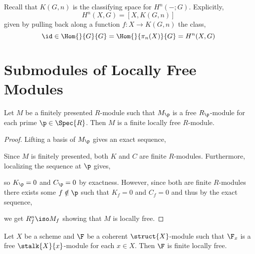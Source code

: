 \documentclass[12pt]{article}
\begin{document}
Recall that $K(G, n)$ is the classifying space for $H^n(- ; G)$. Explicitly,
\[ H^n(X, G) = [X, K(G, n)] \]
given by pulling back along a function $f : X \to K(G,n)$ the class,
\[ \id \in \Hom{}{G}{G} = \Hom{}{\pi_n(X)}{G} = H^n(X, G) \]

\section{Submodules of Locally Free Modules}

\begin{lemma}
Let $M$ be a finitely presented $R$-module such that $M_\p$ is a free $R_\p$-module for each prime $\p \in \Spec{R}$. Then $M$ is a finite locally free $R$-module.
\end{lemma}

\begin{proof}
Lifting a basis of $M_\p$ gives an exact sequence,
\begin{center}
\end{center}
Since $M$ is finitely presented, both $K$ and $C$ are finite $R$-modules. Furthermore, localizing the sequence at $\p$ gives,
\begin{center}
\end{center}
so $K_\p = 0$ and $C_\p = 0$ by exactness. However, since both are finite $R$-modules there exists some $f \notin \p$ such that $K_f = 0$ and $C_f = 0$ and thus by the exact sequence,
\begin{center}
\end{center}
we get $R^n_f \iso M_f$ showing that $M$ is locally free.
\end{proof}

\begin{lemma}
Let $X$ be a scheme and $\F$ be a coherent $\struct{X}$-module such that $\F_x$ is a free $\stalk{X}{x}$-module for each $x \in X$. Then $\F$ is finite locally free.
\end{lemma}
\end{document}
